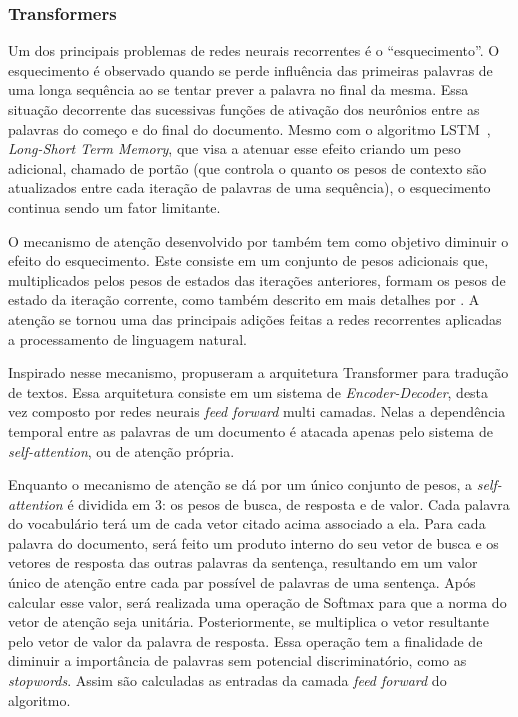 \subsubsection{Transformers}

Um dos principais problemas de redes neurais recorrentes é o ``esquecimento''.
O esquecimento é observado quando se perde influência das primeiras palavras de
uma longa sequência ao se tentar prever a palavra no final da mesma.
Essa situação decorrente das sucessivas funções de ativação dos neurônios entre
as palavras do começo e do final do documento.
Mesmo com o algoritmo LSTM~\cite{hochreiter97}, \textit{Long-Short Term Memory},
que visa a atenuar esse efeito criando um peso adicional, chamado de portão (que
controla o quanto os pesos de contexto são atualizados entre cada iteração de
palavras de uma sequência), o esquecimento continua sendo um fator limitante.

O mecanismo de atenção desenvolvido por \citet{bahdanau14} também tem como
objetivo diminuir o efeito do esquecimento.
Este consiste em um conjunto de pesos adicionais que, multiplicados pelos pesos
de estados das iterações anteriores, formam os pesos de estado da iteração
corrente, como também descrito em mais detalhes por \citet{luong15}.
A atenção se tornou uma das principais adições feitas a redes recorrentes
aplicadas a processamento de linguagem natural.


Inspirado nesse mecanismo, \citet{vaswani17} propuseram a arquitetura
Transformer para tradução de textos.
Essa arquitetura consiste em um sistema de \textit{Encoder-Decoder}, desta vez
composto por redes neurais \textit{feed forward} multi camadas.
Nelas a dependência temporal entre as palavras de um documento é atacada apenas
pelo sistema de \textit{self-attention}, ou de atenção própria.

Enquanto o mecanismo de atenção se dá por um único conjunto de pesos, a
\textit{self-attention} é dividida em 3: os pesos de busca, de resposta e de
valor.
Cada palavra do vocabulário terá um de cada vetor citado acima associado a ela.
Para cada palavra do documento, será feito um produto interno do seu vetor de
busca e os vetores de resposta das outras palavras da sentença, resultando em um
valor único de atenção entre cada par possível de palavras de uma sentença.
Após calcular esse valor, será realizada uma operação de Softmax para que a norma
do vetor de atenção seja unitária.
Posteriormente, se multiplica o vetor resultante pelo vetor de valor da palavra
de resposta.
Essa operação tem a finalidade de diminuir a importância de palavras sem
potencial discriminatório, como as \textit{stopwords}.
Assim são calculadas as entradas da camada \textit{feed forward} do algoritmo.

